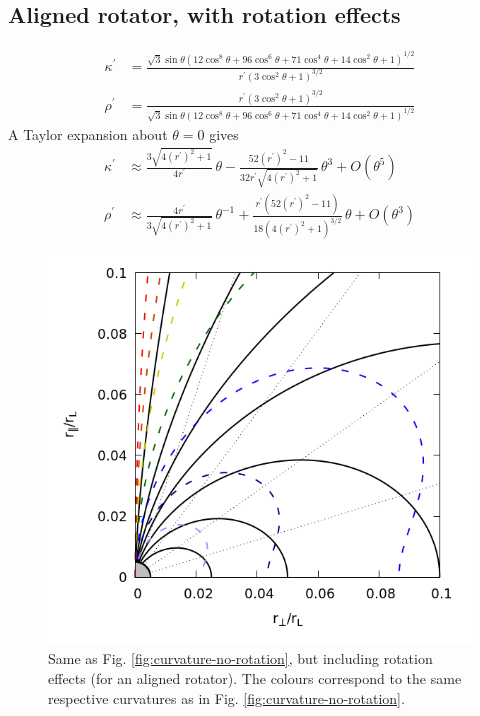 \documentclass{book}
\begin{document}
\subsection{Aligned rotator, with rotation effects}
\begin{equation}
    \begin{aligned}
        \kappa^\prime &= \frac{\sqrt{3}\sin\theta(12\cos^8\theta + 96\cos^6\theta + 71\cos^4\theta + 14\cos^2\theta + 1)^{1/2}}{
                               r^\prime(3\cos^2\theta+1)^{3/2}} \\
                           \rho^\prime   &= \frac{r^\prime(3\cos^2\theta+1)^{3/2}}{
                               \sqrt{3}\sin\theta(12\cos^8\theta + 96\cos^6\theta + 71\cos^4\theta + 14\cos^2\theta + 1)^{1/2}}
    \end{aligned}
\end{equation}
A Taylor expansion about $\theta = 0$ gives
\begin{equation}
    \begin{aligned}
        \kappa^\prime &\approx \frac{3\sqrt{4(r^\prime)^2+1}}{4r^\prime}\,\theta -
                            \frac{52(r^\prime)^2 - 11}{32r^\prime\sqrt{4(r^\prime)^2+1}}\,\theta^3 +
                            O(\theta^5) \\
        \rho^\prime &\approx \frac{4r^\prime}{3\sqrt{4(r^\prime)^2+1}}\,\theta^{-1} +
                          \frac{r^\prime(52(r^\prime)^2 - 11)}{18(4(r^\prime)^2+1)^{3/2}}\,\theta +
                          O(\theta^3)
    \end{aligned}
\end{equation}
\begin{figure}[!p]
    \centering
    \includegraphics[scale=0.45]{images/curvature-with-rotation.png}
    \caption{Same as Fig. \ref{fig:curvature-no-rotation}, but including rotation effects (for an aligned rotator). The colours correspond to the same respective curvatures as in Fig. \ref{fig:curvature-no-rotation}.}
    \label{fig:curvature-with-rotation}
\end{figure}
\end{document}
